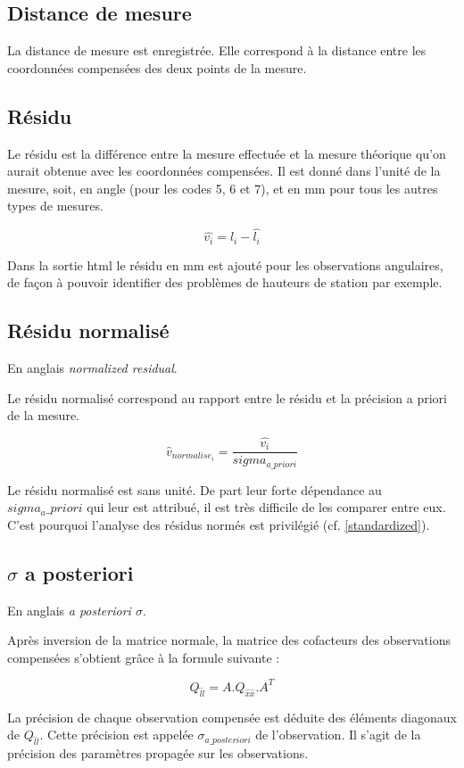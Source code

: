 \documentclass[french]{report}
\begin{document}
\subsection{Distance de mesure}

La distance de mesure est enregistrée. Elle correspond à la distance entre les coordonnées compensées des deux points de la mesure.

\subsection{Résidu}
Le résidu est la différence entre la mesure effectuée et la mesure théorique qu'on aurait obtenue avec les
coordonnées compensées.
Il est donné dans l'unité de la mesure, soit, en angle (pour les codes 5, 6 et 7), et en mm pour tous les autres types de
mesures.

$$\hat{v_i}=l_i-\hat{l_i}$$

Dans la sortie html le résidu en mm est ajouté pour les observations angulaires, de façon à pouvoir identifier
des problèmes de hauteurs de station par exemple.


\subsection{Résidu normalisé}

En anglais \textit{normalized residual}.

Le résidu normalisé correspond au rapport entre le résidu et la précision a priori de la mesure.

$$\hat{v}_{normalise_{i}}=\frac{\hat{v_i}}{sigma_{a\_priori}}$$

Le résidu normalisé est sans unité. De part leur forte dépendance au $sigma_a\_priori$ qui leur est attribué, il est
très difficile de les comparer entre eux. C'est pourquoi l'analyse des résidus normés est privilégié (cf. \ref{standardized}).


\subsection{$\sigma$ a posteriori}

En anglais \textit{a posteriori $\sigma$}.

Après inversion de la matrice normale, la matrice des cofacteurs des observations compensées s'obtient grâce à la formule suivante :

$$ Q_{\hat{l}\hat{l}} = A . Q_{\hat{x}\hat{x}} . A^T $$

La précision de chaque observation compensée est déduite des éléments diagonaux de $ Q_{\hat{l}\hat{l}} $.
Cette précision est appelée $\sigma_{a\_posteriori}$ de l'observation.
Il s'agit de la précision des paramètres propagée sur les observations.
\end{document}
